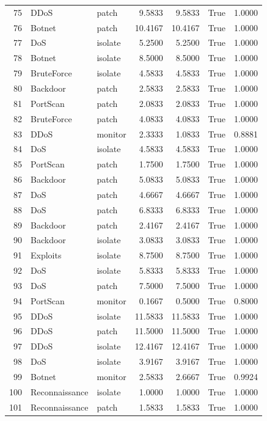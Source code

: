 \begin{table}
\begin{tabular}{rllrrrr}
75 & DDoS & patch & 9.5833 & 9.5833 & True & 1.0000 \\
76 & Botnet & patch & 10.4167 & 10.4167 & True & 1.0000 \\
77 & DoS & isolate & 5.2500 & 5.2500 & True & 1.0000 \\
78 & Botnet & isolate & 8.5000 & 8.5000 & True & 1.0000 \\
79 & BruteForce & isolate & 4.5833 & 4.5833 & True & 1.0000 \\
80 & Backdoor & patch & 2.5833 & 2.5833 & True & 1.0000 \\
81 & PortScan & patch & 2.0833 & 2.0833 & True & 1.0000 \\
82 & BruteForce & patch & 4.0833 & 4.0833 & True & 1.0000 \\
83 & DDoS & monitor & 2.3333 & 1.0833 & True & 0.8881 \\
84 & DoS & isolate & 4.5833 & 4.5833 & True & 1.0000 \\
85 & PortScan & patch & 1.7500 & 1.7500 & True & 1.0000 \\
86 & Backdoor & patch & 5.0833 & 5.0833 & True & 1.0000 \\
87 & DoS & patch & 4.6667 & 4.6667 & True & 1.0000 \\
88 & DoS & patch & 6.8333 & 6.8333 & True & 1.0000 \\
89 & Backdoor & patch & 2.4167 & 2.4167 & True & 1.0000 \\
90 & Backdoor & isolate & 3.0833 & 3.0833 & True & 1.0000 \\
91 & Exploits & isolate & 8.7500 & 8.7500 & True & 1.0000 \\
92 & DoS & isolate & 5.8333 & 5.8333 & True & 1.0000 \\
93 & DoS & patch & 7.5000 & 7.5000 & True & 1.0000 \\
94 & PortScan & monitor & 0.1667 & 0.5000 & True & 0.8000 \\
95 & DDoS & isolate & 11.5833 & 11.5833 & True & 1.0000 \\
96 & DDoS & patch & 11.5000 & 11.5000 & True & 1.0000 \\
97 & DDoS & isolate & 12.4167 & 12.4167 & True & 1.0000 \\
98 & DoS & isolate & 3.9167 & 3.9167 & True & 1.0000 \\
99 & Botnet & monitor & 2.5833 & 2.6667 & True & 0.9924 \\
100 & Reconnaissance & isolate & 1.0000 & 1.0000 & True & 1.0000 \\
101 & Reconnaissance & patch & 1.5833 & 1.5833 & True & 1.0000 \\

\end{tabular}
\end{table}
